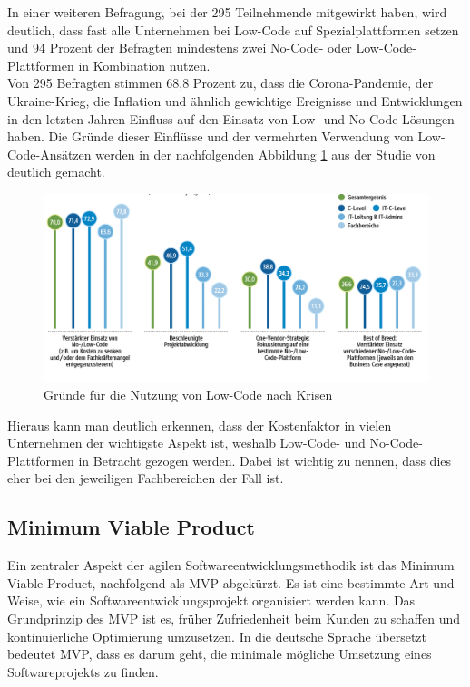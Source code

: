 \documentclass[acmtog, language=ngerman]{acmart}
\begin{document}
In einer weiteren Befragung, bei der 295 Teilnehmende mitgewirkt haben, wird deutlich, dass fast alle Unternehmen bei Low-Code auf Spezialplattformen setzen und 94 Prozent \cite{studie_low_code} der Befragten mindestens zwei No-Code- oder Low-Code-Plattformen in Kombination nutzen.
\\

Von 295 Befragten stimmen 68,8 Prozent \cite{studie_low_code} zu, dass die Corona-Pandemie, der Ukraine-Krieg, die Inflation und ähnlich gewichtige Ereignisse und Entwicklungen in den letzten Jahren Einfluss auf den Einsatz von Low- und No-Code-Lösungen haben.
Die Gründe dieser Einflüsse und der vermehrten Verwendung von Low-Code-Ansätzen werden in der nachfolgenden Abbildung \ref{fig:lowcode_gruende} aus der Studie von \cite{studie_low_code} deutlich gemacht.
\begin{figure}[h]
    \centering
    \includegraphics[width=1\linewidth]{images/studie_gruende.png}
    \caption{Gründe für die Nutzung von Low-Code nach Krisen \cite{studie_low_code}}
    \label{fig:lowcode_gruende}
\end{figure}
\newline
Hieraus kann man deutlich erkennen, dass der Kostenfaktor in vielen Unternehmen der wichtigste Aspekt ist, weshalb Low-Code- und No-Code-Plattformen in Betracht gezogen werden. Dabei ist wichtig zu nennen, dass dies eher bei den jeweiligen Fachbereichen der Fall ist.

\subsection{Minimum Viable Product} \label{sec:mvp}
Ein zentraler Aspekt der agilen Softwareentwicklungsmethodik ist das Minimum Viable Product, nachfolgend als MVP abgekürzt. Es ist eine bestimmte Art und Weise, wie ein Softwareentwicklungsprojekt organisiert werden kann.
Das Grundprinzip des MVP ist es, früher Zufriedenheit beim Kunden zu schaffen und kontinuierliche Optimierung umzusetzen. In die deutsche Sprache übersetzt bedeutet MVP, dass es darum geht, die minimale mögliche Umsetzung eines Softwareprojekts zu finden.
\end{document}
